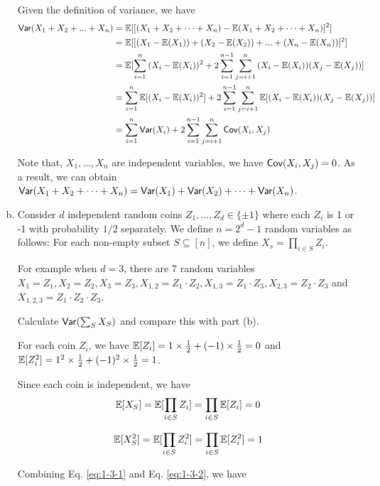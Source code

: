 \begin{problem}[30 points]
\begin{enumerate}[(a)]
Given the definition of variance, we have
\begin{align} \label{eq:1-b}
\notag \mathsf{Var}(X_1 + X_2 + ... + X_n) &= \operatorname*{\mathbb{E}}[[(X_1 + X_2 + \cdots + X_n) - \operatorname*{\mathbb{E}}(X_1 + X_2 + \cdots + X_n)]^2]\\
\notag & = \operatorname*{\mathbb{E}}[[(X_1 - \operatorname*{\mathbb{E}}(X_1)) + (X_2 - \operatorname*{\mathbb{E}}(X_2)) + ... + (X_n - \operatorname*{\mathbb{E}}(X_n))]^2] \\
\notag & = \operatorname*{\mathbb{E}}[\sum_{i=1}^{n}{(X_i - \operatorname*{\mathbb{E}}(X_i))^2} + 2\sum_{i=1}^{n-1}\sum_{j=i+1}^{n}{(X_i - \operatorname*{\mathbb{E}}(X_i))(X_j - \operatorname*{\mathbb{E}}(X_j))}] \\
\notag & = \sum_{i=1}^{n}{\operatorname*{\mathbb{E}}[(X_i - \operatorname*{\mathbb{E}}(X_i))^2]} + 2\sum_{i=1}^{n-1}\sum_{j=i+1}^{n}{\operatorname*{\mathbb{E}}[(X_i - \operatorname*{\mathbb{E}}(X_i))(X_j - \operatorname*{\mathbb{E}}(X_j))]} \notag \\
& = \sum_{i=1}^{n}{\mathsf{Var}(X_i)} + 2\sum_{i=1}^{n-1}\sum_{j=i+1}^{n}{\mathsf{Cov}(X_i, X_j)}
\end{align}

Note that, $X_1, ..., X_n$ are independent variables, we have $\mathsf{Cov}(X_i, X_j) = 0$. As a result, we can obtain $\mathsf{Var}(X_1 + X_2 + \cdots + X_n) = \mathsf{Var}(X_1) + \mathsf{Var}(X_2) + \cdots + \mathsf{Var}(X_n)$.


\item Consider $d$ independent random coins $Z_1, ..., Z_d \in \{\pm 1\}$ where each $Z_i$ is 1 or -1 with probability $1/2$ separately. We define $n = 2^d - 1$ random variables as follows: 
For each non-empty subset $S \subseteq [n]$, we define $X_s = \prod_{i \in S} Z_i$. 

For example when $d = 3$, there are 7 random variables $X_1 = Z_1, X_2 = Z_2, X_3 = Z_3, X_{1,2} = Z_1 \cdot Z_2, X_{1,3} = Z_1 \cdot Z_3, X_{2,3} = Z_2 \cdot Z_3$
and $X_{1,2,3} = Z_1 \cdot Z_2 \cdot Z_3$. 

Calculate $\mathsf{Var}(\sum_{S}X_S)$ and compare this with part (b).

\Answer

For each coin $Z_i$, we have $\operatorname*{\mathbb{E}}[Z_i] = 1 \times \frac{1}{2} + (-1) \times \frac{1}{2} = 0$ and $\operatorname*{\mathbb{E}}[Z_i^2] = 1^2 \times \frac{1}{2} + (-1)^2 \times \frac{1}{2} = 1$.

Since each coin is independent, we have 
\begin{equation} \label{eq:1-3-1}
    \operatorname*{\mathbb{E}}[X_S] = \operatorname*{\mathbb{E}}[\prod_{i \in S}Z_i] = \prod_{i \in S}\operatorname*{\mathbb{E}}[Z_i] = 0
\end{equation}

\begin{equation} \label{eq:1-3-2}
    \operatorname*{\mathbb{E}}[X_S^2] = \operatorname*{\mathbb{E}}[\prod_{i \in S}Z_i^2] = \prod_{i \in S}\operatorname*{\mathbb{E}}[Z_i^2] = 1
\end{equation}

Combining Eq. \eqref{eq:1-3-1} and Eq. \eqref{eq:1-3-2}, we have


\end{enumerate}
\end{problem}
